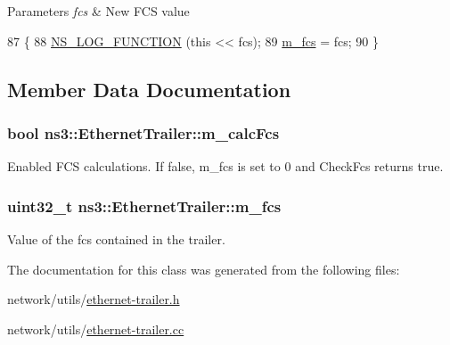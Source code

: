 \begin{DoxyParams}{Parameters}
{\em fcs} & New F\+CS value \\
\hline
\end{DoxyParams}

\begin{DoxyCode}
87 \{
88   \hyperlink{log-macros-disabled_8h_a90b90d5bad1f39cb1b64923ea94c0761}{NS\_LOG\_FUNCTION} (\textcolor{keyword}{this} << fcs);
89   \hyperlink{classns3_1_1EthernetTrailer_acc03b4e2e8a1778c79c4508ed20fe0c6}{m\_fcs} = fcs;
90 \}
\end{DoxyCode}


\subsection{Member Data Documentation}
\subsubsection[{\texorpdfstring{m\+\_\+calc\+Fcs}{m_calcFcs}}]{\setlength{\rightskip}{0pt plus 5cm}bool ns3\+::\+Ethernet\+Trailer\+::m\+\_\+calc\+Fcs\hspace{0.3cm}{\ttfamily [private]}}\hypertarget{classns3_1_1EthernetTrailer_a9ca507a0de944accf639cc345e46e838}{}\label{classns3_1_1EthernetTrailer_a9ca507a0de944accf639cc345e46e838}
Enabled F\+CS calculations. If false, m\+\_\+fcs is set to 0 and Check\+Fcs returns true. 
\subsubsection[{\texorpdfstring{m\+\_\+fcs}{m_fcs}}]{\setlength{\rightskip}{0pt plus 5cm}uint32\+\_\+t ns3\+::\+Ethernet\+Trailer\+::m\+\_\+fcs\hspace{0.3cm}{\ttfamily [private]}}\hypertarget{classns3_1_1EthernetTrailer_acc03b4e2e8a1778c79c4508ed20fe0c6}{}\label{classns3_1_1EthernetTrailer_acc03b4e2e8a1778c79c4508ed20fe0c6}


Value of the fcs contained in the trailer. 



The documentation for this class was generated from the following files\+:\begin{DoxyCompactItemize}
\item 
network/utils/\hyperlink{ethernet-trailer_8h}{ethernet-\/trailer.\+h}\item 
network/utils/\hyperlink{ethernet-trailer_8cc}{ethernet-\/trailer.\+cc}\end{DoxyCompactItemize}
